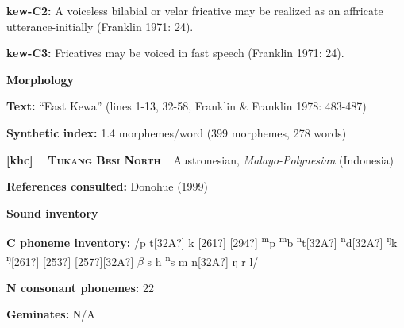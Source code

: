 \begin{styleBody}
\textbf{kew-C2: }A voiceless bilabial or velar fricative may be realized as an affricate utterance-initially (Franklin 1971: 24).
\end{styleBody}

\begin{styleBody}
\textbf{kew-C3: }Fricatives may be voiced in fast speech (Franklin 1971: 24).
\end{styleBody}

\begin{styleBody}
\textbf{Morphology}
\end{styleBody}

\begin{styleBody}
\textbf{Text: }“East Kewa” (lines 1-13, 32-58, Franklin \& Franklin 1978: 483-487)
\end{styleBody}

\begin{styleBody}
\textbf{Synthetic index: }1.4 morphemes/word (399 morphemes, 278 words)
\end{styleBody}

\clearpage\begin{styleBody}
\textbf{[khc] }\ \ \textbf{\textsc{Tukang Besi North}}\textbf{\ \ }Austronesian, \textit{Malayo-Polynesian} (Indonesia)
\end{styleBody}

\begin{styleBody}
\textbf{References consulted: }Donohue (1999)
\end{styleBody}

\begin{styleBody}
\textbf{Sound inventory}
\end{styleBody}

\begin{styleBody}
\textbf{C phoneme inventory:} /p t[32A?] k [261?] [294?] \textsuperscript{m}p \textsuperscript{m}b \textsuperscript{n}t[32A?] \textsuperscript{n}d[32A?] \textsuperscript{ŋ}k \textsuperscript{ŋ}[261?] [253?] [257?][32A?] $\beta $ s h \textsuperscript{n}s m n[32A?] ŋ r l/
\end{styleBody}

\begin{styleBody}
\textbf{N consonant phonemes:} 22
\end{styleBody}

\begin{styleBody}
\textbf{Geminates:} N/A
\end{styleBody}

